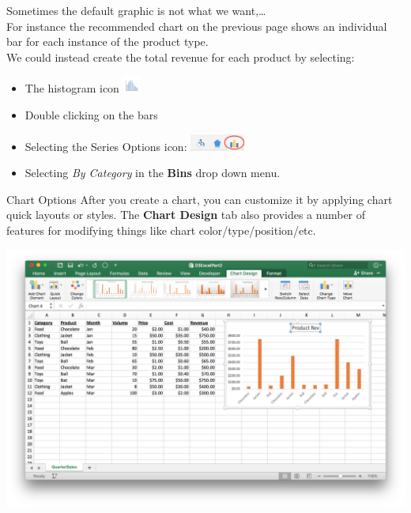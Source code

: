 \documentclass[xcolor=svgnames, handout]{beamer}
\begin{document}
\begin{frame}
 Sometimes the default graphic is not what we want,\dots\\
 \medskip
 For instance the recommended chart on the previous page shows an individual bar for each instance of the product type.\\
 \medskip 
 We could instead create the total revenue for each product by selecting:
 \begin{itemize}
 \item The histogram icon \includegraphics[height=1.5em]{histicon}
 \item Double clicking on the bars
 \item Selecting the Series Options icon: \includegraphics[height=1.5em]{seriesopt}
 \item Selecting {\it By Category} in the {\bf Bins} drop down menu.
 \end{itemize}
 
 \end{frame}


\begin{frame}{Chart Options}
After you create a chart, you can customize it by applying chart quick layouts or styles.  The
\textbf{Chart Design} tab also provides a number of features for modifying things like chart color/type/position/etc.
 \begin{center}
  \includegraphics[width=.8\textwidth]{ChartTools2}
 \end{center}

\end{frame}
\end{document}
